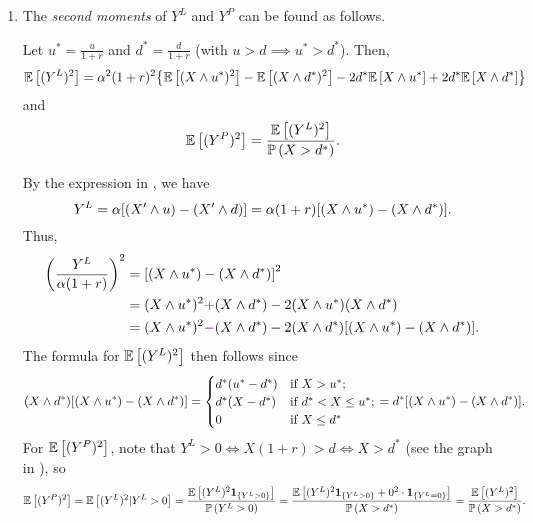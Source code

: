 \begin{enumerate}
\item The \emph{second moments} of \(Y^L\) and \(Y^P\) can be found as follows.
\begin{proposition}
\label{prp:gen-insur-ylyp-second-mom}
Let \(\displaystyle u^*=\frac{u}{1+r}\) and \(\displaystyle
d^*=\frac{d}{1+r}\) (with \(u>d\implies u^*>d^*\)). Then,
\[
\mathbb{E}\left[(Y^L)^2\right]=\alpha^2(1+r)^2\qty{\mathbb{E}\left[(X\wedge u^*)^2\right]-\mathbb{E}\left[(X\wedge d^*)^2\right]-2d^*\mathbb{E}\left[X\wedge u^*\right]+2d^*\mathbb{E}\left[X\wedge d^*\right]}
\]
and
\[
\mathbb{E}\left[(Y^P)^2\right]=\frac{\mathbb{E}\left[(Y^L)^2\right]}{\mathbb{P}\left(X>d^*\right)}.
\]
\end{proposition}
\begin{pf}
By the expression in , we have
\[
Y^L=\alpha\qty[(X'\wedge u)-(X'\wedge d)]
=\alpha(1+r)\qty[(X\wedge u^*)-(X\wedge d^*)].
\]
Thus,
\begin{align*}
\qty(\frac{Y^L}{\alpha(1+r)})^{2}
&=\qty[(X\wedge u^*)-(X\wedge d^*)]^2 \\
&=(X\wedge u^*)^2{\color{violet}+}(X\wedge d^*)-2(X\wedge u^*)(X\wedge d^*) \\
&=(X\wedge u^*)^2{\color{violet}-}(X\wedge d^*)-2(X\wedge d^*)\qty[(X\wedge u^*)-(X\wedge d^*)].
\end{align*}
The formula for \(\mathbb{E}\left[(Y^L)^2\right]\) then follows since
\[
(X\wedge d^*)\qty[(X\wedge u^*)-(X\wedge d^*)]
=\begin{cases}
d^{*}(u^*-d^*)&\text{if \(X>u^{*}\)}; \\
d^{*}(X-d^*)&\text{if \(d^*<X\le u^{*}\)}; \\
0&\text{if \(X\le d^{*}\)}
\end{cases}
=d^*\qty[(X\wedge u^*)-(X\wedge d^*)].
\]
For \(\mathbb{E}\left[(Y^P)^2\right]\), note that \(Y^L>0\iff X(1+r)>d\iff X>d^*\) (see the
graph in ), so
\[
\mathbb{E}\left[(Y^P)^2\right]
=\mathbb{E}\left[(Y^L)^2|Y^L>0\right]
=\frac{\mathbb{E}\left[(Y^L)^2\mathbf{1}_{\left\{Y^L>0\right\}}\right]}{\mathbb{P}\left(Y^L>0\right)}
=\frac{\mathbb{E}\left[(Y^L)^2\mathbf{1}_{\left\{Y^L>0\right\}}+0^{2}\cdot \mathbf{1}_{\left\{Y^L=0\right\}}\right]}{\mathbb{P}\left(X>d^*\right)}
=\frac{\mathbb{E}\left[(Y^L)^2\right]}{\mathbb{P}\left(X>d^*\right)}.
\]
\end{pf}
\end{enumerate}
